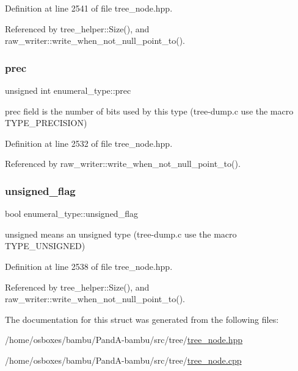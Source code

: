 Definition at line 2541 of file tree\+\_\+node.\+hpp.



Referenced by tree\+\_\+helper\+::\+Size(), and raw\+\_\+writer\+::write\+\_\+when\+\_\+not\+\_\+null\+\_\+point\+\_\+to().

\mbox{\label{structenumeral__type_a54f9c97197f9310ed801c7ff1f5fd28b}} 
\subsubsection{\texorpdfstring{prec}{prec}}
{\footnotesize\ttfamily unsigned int enumeral\+\_\+type\+::prec}



prec field is the number of bits used by this type (tree-\/dump.\+c use the macro T\+Y\+P\+E\+\_\+\+P\+R\+E\+C\+I\+S\+I\+ON) 



Definition at line 2532 of file tree\+\_\+node.\+hpp.



Referenced by raw\+\_\+writer\+::write\+\_\+when\+\_\+not\+\_\+null\+\_\+point\+\_\+to().

\mbox{\label{structenumeral__type_a150a6ae073923f3fdf8222afe2fe9caa}} 
\subsubsection{\texorpdfstring{unsigned\+\_\+flag}{unsigned\_flag}}
{\footnotesize\ttfamily bool enumeral\+\_\+type\+::unsigned\+\_\+flag}



unsigned means an unsigned type (tree-\/dump.\+c use the macro T\+Y\+P\+E\+\_\+\+U\+N\+S\+I\+G\+N\+ED) 



Definition at line 2538 of file tree\+\_\+node.\+hpp.



Referenced by tree\+\_\+helper\+::\+Size(), and raw\+\_\+writer\+::write\+\_\+when\+\_\+not\+\_\+null\+\_\+point\+\_\+to().



The documentation for this struct was generated from the following files\+:\begin{DoxyCompactItemize}
\item 
/home/osboxes/bambu/\+Pand\+A-\/bambu/src/tree/\hyperlink{tree__node_8hpp}{tree\+\_\+node.\+hpp}\item 
/home/osboxes/bambu/\+Pand\+A-\/bambu/src/tree/\hyperlink{tree__node_8cpp}{tree\+\_\+node.\+cpp}\end{DoxyCompactItemize}
